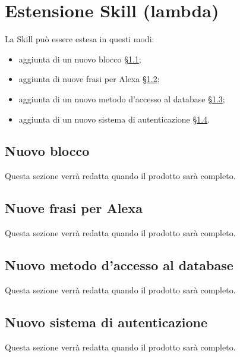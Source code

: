 \section{Estensione Skill (lambda)}
La Skill può essere estesa in questi modi:
\begin{itemize}
    \item aggiunta di un nuovo blocco \S\ref{newBlock};
    \item aggiunta di nuove frasi per Alexa \S\ref{newFrasi};
    \item aggiunta di un nuovo metodo d'accesso al database \S\ref{newAccesso};
    \item aggiunta di un nuovo sistema di autenticazione \S\ref{newAuth}.
\end{itemize}
\subsection{Nuovo blocco}\label{newBlock}
Questa sezione verrà redatta quando il prodotto sarà completo.
\subsection{Nuove frasi per Alexa}\label{newFrasi}
Questa sezione verrà redatta quando il prodotto sarà completo.
\subsection{Nuovo metodo d'accesso al database} \label{newAccesso}
Questa sezione verrà redatta quando il prodotto sarà completo.
\subsection{Nuovo sistema di autenticazione}\label{newAuth}
Questa sezione verrà redatta quando il prodotto sarà completo.